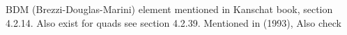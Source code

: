 
BDM (Brezzi-Douglas-Marini) element mentioned in Kanschat book, section 4.2.14. 
Also exist for quads see section 4.2.39.
Mentioned in \textcite{chen93a} (1993), Also check \textcite{brfo}
